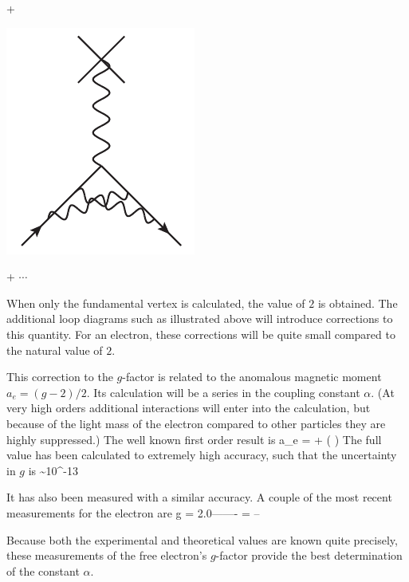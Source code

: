 {\begin{minipage}{1in}
\end{minipage}
+
\begin{minipage}{1in}
   \begin{center} \includegraphics[scale=0.5]{eps/QEDloop2} \end{center} 
\end{minipage}
+ \hspace{2em} $\cdots$
 }
 
When only the fundamental vertex is calculated, the value of $2$ is obtained.  The additional loop diagrams such as illustrated above will introduce corrections to this quantity.  For an electron, these corrections will be quite small compared to the natural value of $2$.  
 
 
 
 This correction to the $g$-factor is related to the anomalous magnetic moment $a_e = (g-2)/2$.  Its calculation will be a series in the coupling constant $\alpha$.   (At very high orders additional interactions will enter into the calculation, but because of the light mass of the electron compared to other particles they are highly suppressed.)  The well known first order result is
 \beq
 	a_e = \frac{\alpha}{2\pi} + ( )
 \eeq
The full value has been calculated to extremely high accuracy, such that the uncertainty in $g$ is 
\beq
	 \sim 10^{-13}
\eeq

It has also been measured with a similar accuracy.  A couple of the most recent measurements for the electron are
\beq
	g = 2.0-------    \hspace{2em} \delta = -- 
\eeq

Because both the experimental and theoretical values are known quite precisely, these measurements of the free electron's $g$-factor provide the best determination of the constant $\alpha$.  

